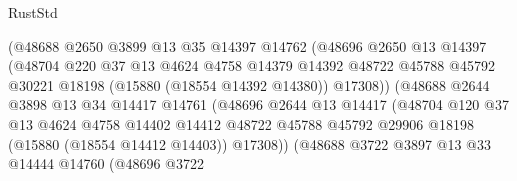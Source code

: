 \begin{lexlean}{RustStd}
\begin{coremodule}
                              (@48688
                                @2650
                                @3899
                                @13
                                @35
                                @14397
                                @14762
                                (@48696
                                  @2650
                                  @13
                                  @14397
                                  (@48704
                                    @220
                                    @37
                                    @13
                                    @4624
                                    @4758
                                    @14379
                                    @14392
                                    @48722
                                    @45788
                                    @45792
                                    @30221
                                    @18198
                                    (@15880 (@18554 @14392 @14380))
                                    @17308))
                                (@48688
                                  @2644
                                  @3898
                                  @13
                                  @34
                                  @14417
                                  @14761
                                  (@48696
                                    @2644
                                    @13
                                    @14417
                                    (@48704
                                      @120
                                      @37
                                      @13
                                      @4624
                                      @4758
                                      @14402
                                      @14412
                                      @48722
                                      @45788
                                      @45792
                                      @29906
                                      @18198
                                      (@15880 (@18554 @14412 @14403))
                                      @17308))
                                  (@48688
                                    @3722
                                    @3897
                                    @13
                                    @33
                                    @14444
                                    @14760
                                    (@48696
                                      @3722

\end{coremodule}
\end{lexlean}
